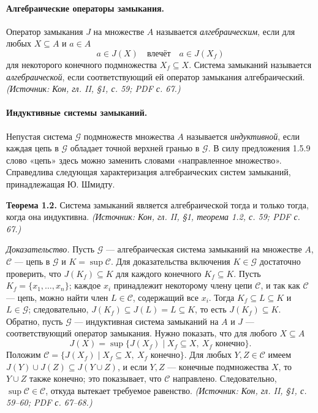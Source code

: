 \documentclass[a4paper,12pt]{article}
\begin{document}
\paragraph{Алгебраические операторы замыкания.}
Оператор замыкания \(J\) на множестве \(A\) называется \emph{алгебраическим}, если для любых \(X\subseteq A\) и \(a\in A\)
\[
a\in J(X)\quad\text{влечёт}\quad a\in J(X_f)
\]
для некоторого конечного подмножества \(X_f\subseteq X\). Система замыканий называется \emph{алгебраической}, если соответствующий ей оператор замыкания алгебраический.
\textit{(Источник: Кон, гл. II, §1, с. 59; PDF с. 67.)}

\paragraph{Индуктивные системы замыканий.}
Непустая система \(\mathcal{G}\) подмножеств множества \(A\) называется \emph{индуктивной}, если каждая цепь в \(\mathcal{G}\) обладает точной верхней гранью в \(\mathcal{G}\). В силу предложения 1.5.9 слово «цепь» здесь можно заменить словами «направленное множество». Справедлива следующая характеризация алгебраических систем замыканий, принадлежащая Ю. Шмидту.

\textbf{Теорема 1.2.} Система замыканий является алгебраической тогда и только тогда, когда она индуктивна.
\textit{(Источник: Кон, гл. II, §1, теорема 1.2, с. 59; PDF с. 67.)}

\emph{Доказательство.} Пусть \(\mathcal{G}\) — алгебраическая система замыканий на множестве \(A\), \(\mathcal{C}\) — цепь в \(\mathcal{G}\) и \(K=\sup\mathcal{C}\). Для доказательства включения \(K\in\mathcal{G}\) достаточно проверить, что \(J(K_f)\subseteq K\) для каждого конечного \(K_f\subseteq K\). Пусть \(K_f=\{x_1,\ldots,x_n\}\); каждое \(x_i\) принадлежит некоторому члену цепи \(\mathcal{C}\), и так как \(\mathcal{C}\) — цепь, можно найти член \(L\in\mathcal{C}\), содержащий все \(x_i\). Тогда \(K_f\subseteq L\subseteq K\) и \(L\in\mathcal{G}\); следовательно, \(J(K_f)\subseteq J(L)=L\subseteq K\), то есть \(J(K_f)\subseteq K\).
Обратно, пусть \(\mathcal{G}\) — индуктивная система замыканий на \(A\) и \(J\) — соответствующий оператор замыкания. Нужно показать, что для любого \(X\subseteq A\)
\[
J(X)=\sup\{J(X_f)\mid X_f\subseteq X,\ X_f\text{ конечно}\}.
\]
Положим \(\mathcal{C}=\{J(X_f)\mid X_f\subseteq X,\ X_f\text{ конечно}\}\). Для любых \(Y,Z\in\mathcal{C}\) имеем \(J(Y)\cup J(Z)\subseteq J(Y\cup Z)\), и если \(Y,Z\) — конечные подмножества \(X\), то \(Y\cup Z\) также конечно; это показывает, что \(\mathcal{C}\) направлено. Следовательно, \(\sup\mathcal{C}\in\mathcal{C}\), откуда вытекает требуемое равенство.
\textit{(Источник: Кон, гл. II, §1, с. 59--60; PDF с. 67--68.)}
\end{document}
